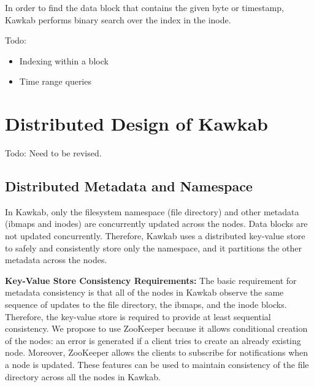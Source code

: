 \documentclass[]{article}
\newcommand{\subtopic}[1]{\vspace{1.5pt} \noindent \textbf{#1}}
\newcommand{\hl}[1]{\textcolor{hlcolor}{#1}}
\begin{document}
In order to find the data block that contains the given byte or timestamp, Kawkab
performs binary search over the index in the inode.

Todo:

\begin{itemize}
  \item Indexing within a block
  \item Time range queries
\end{itemize}




\section{Distributed Design of Kawkab}

\hl{Todo: Need to be revised.}

\subsection{Distributed Metadata and Namespace}

In Kawkab, only the filesystem namespace (file directory) and other metadata
(ibmaps and inodes) are concurrently updated across the nodes. Data blocks are
not updated concurrently. Therefore, Kawkab uses a distributed key-value store
to safely and consistently store only the namespace, and it partitions the 
other metadata across the nodes.

\subtopic{Key-Value Store Consistency Requirements:} The basic requirement for
metadata consistency is that all of the nodes in Kawkab observe the same
sequence of updates to the file directory, the ibmaps, and the inode blocks.  
Therefore, the key-value store is required to provide at least sequential
consistency.
We propose to use ZooKeeper because it allows conditional creation of the
nodes: an error is generated if a client tries to create an already existing
node. Moreover, ZooKeeper allows the clients to subscribe for notifications
when a node is updated.  These features can be used to maintain consistency
of the file directory across all the nodes in Kawkab.
\end{document}
